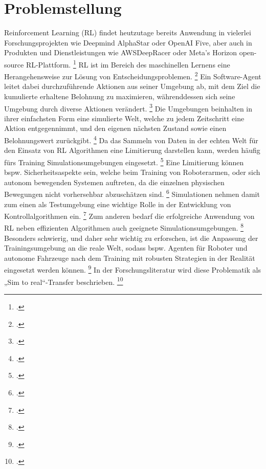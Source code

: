 \section{Problemstellung}

Reinforcement Learning (RL) findet heutzutage bereits Anwendung in vielerlei Forschungsprojekten wie Deepmind AlphaStar oder OpenAI Five, aber auch in Produkten und Dienstleistungen wie AWSDeepRacer oder Meta's Horizon open-source RL-Plattform. \footcite[Vgl.][S. 4]{Li.2019}
RL ist im Bereich des maschinellen Lernens eine Herangehensweise zur Lösung von Entscheidungsproblemen. \footcite[Vgl.][S. 3]{Schuderer.2021}
Ein Software-Agent leitet dabei durchzuführende Aktionen aus seiner Umgebung ab, mit dem Ziel die kumulierte erhaltene Belohnung zu maximieren, währenddessen sich seine Umgebung durch diverse Aktionen verändert. \footcite[Vgl.][S. 3]{Schuderer.2021}
Die Umgebungen beinhalten in ihrer einfachsten Form eine simulierte Welt, welche zu jedem Zeitschritt eine Aktion entgegennimmt, und den eigenen nächsten Zustand sowie einen Belohnungswert zurückgibt. \footcite[Vgl.][S. 1]{Reda.2020}
Da das Sammeln von Daten in der echten Welt für den Einsatz von RL Algorithmen eine Limitierung darstellen kann, werden häufig fürs Training Simulationsumgebungen eingesetzt. \footcite[Vgl.][S. 737]{Zhao.2020}
Eine Limitierung können bspw. Sicherheitsaspekte sein, welche beim Training von Roboterarmen, oder sich autonom bewegenden Systemen auftreten, da die einzelnen physischen Bewegungen nicht vorhersehbar abzuschätzen sind. \footcite[Vgl.][S. 738]{Zhao.2020}
Simulationen nehmen damit zum einen als Testumgebung eine wichtige Rolle in der Entwicklung von Kontrollalgorithmen ein. \footcite[Vgl.][S. 2]{Cutler.2014}
Zum anderen bedarf die erfolgreiche Anwendung von RL neben effizienten Algorithmen auch geeignete Simulationsumgebungen. \footcite[Vgl.][S. 8]{Reda.2020}
Besonders schwierig, und daher sehr wichtig zu erforschen, ist die Anpassung der Trainingsumgebung an die reale Welt, sodass bspw. Agenten für Roboter und autonome Fahrzeuge nach dem Training mit robusten Strategien in der Realität eingesetzt werden können. \footcite[Vgl.][S. 1]{DBLP:journals/corr/abs-1910-10537}
In der Forschungsliteratur wird diese Problematik als „Sim to real“-Transfer beschrieben. \footcite[Vgl.][S. 738]{Zhao.2020}

